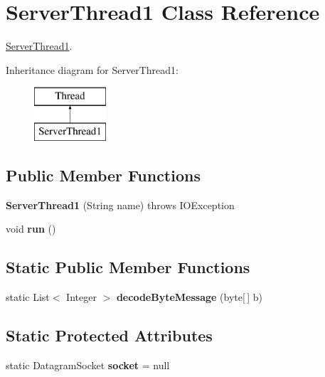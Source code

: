 \hypertarget{class_server_thread1}{}\section{Server\+Thread1 Class Reference}
\label{class_server_thread1}


\hyperlink{class_server_thread1}{Server\+Thread1}.  


Inheritance diagram for Server\+Thread1\+:\begin{figure}[H]
\begin{center}
\leavevmode
\includegraphics[height=2.000000cm]{class_server_thread1}
\end{center}
\end{figure}
\subsection*{Public Member Functions}
\begin{DoxyCompactItemize}
\item 
{\bfseries Server\+Thread1} (String name)  throws I\+O\+Exception\hypertarget{class_server_thread1_ae29df115466a434608801b3c751def7d}{}\label{class_server_thread1_ae29df115466a434608801b3c751def7d}

\item 
void {\bfseries run} ()\hypertarget{class_server_thread1_ad91d48187f6e88a980d36b2182ec1c55}{}\label{class_server_thread1_ad91d48187f6e88a980d36b2182ec1c55}

\end{DoxyCompactItemize}
\subsection*{Static Public Member Functions}
\begin{DoxyCompactItemize}
\item 
static List$<$ Integer $>$ {\bfseries decode\+Byte\+Message} (byte\mbox{[}$\,$\mbox{]} b)\hypertarget{class_server_thread1_a81e7367f1e95b9e1ecdbbc8b5da526b7}{}\label{class_server_thread1_a81e7367f1e95b9e1ecdbbc8b5da526b7}

\end{DoxyCompactItemize}
\subsection*{Static Protected Attributes}
\begin{DoxyCompactItemize}
\item 
static Datagram\+Socket {\bfseries socket} = null\hypertarget{class_server_thread1_a99569f086bee535af8d46d6c6f4b46db}{}\label{class_server_thread1_a99569f086bee535af8d46d6c6f4b46db}

\end{DoxyCompactItemize}


